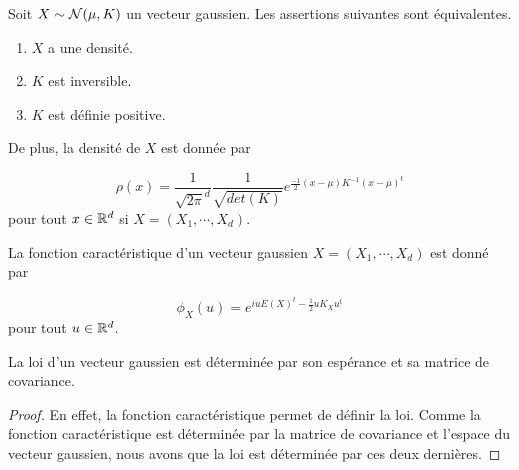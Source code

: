 \begin{proposition}
	Soit $X \sim \mathcal{N}(\mu, K)$ un vecteur gaussien. Les assertions
	suivantes sont équivalentes.

	\begin{enumerate}
		\item $X$ a une densité.
		\item $K$ est inversible.
		\item $K$ est définie positive.
	\end{enumerate}

	De plus, la densité de $X$ est donnée par

	\begin{equation}
		\rho(x) = \frac{1}{\sqrt{2 \pi}^{d}} \frac{1}{\sqrt{det(K)}}
		e^{\frac{-1}{2} (x - \mu) K^{-1} (x - \mu)^{t}}
	\end{equation}
	pour tout $x \in \mathbb{R}^{d}$ si $X = (X_{1}, \cdots, X_{d})$.
\end{proposition}

\begin{proposition}
	La fonction caractéristique d'un vecteur gaussien $X = (X_{1}, \cdots,
	X_{d})$ est donné par

	\begin{equation}
		\phi_{X}(u) = e^{iu E(X)^{t} - \frac{1}{2} u K_{X} u^{t}}
	\end{equation}
	pour tout $u \in \mathbb{R}^{d}$.
\end{proposition}

\begin{corollary}
	La loi d'un vecteur gaussien est déterminée par son espérance et sa matrice
	de covariance.
\end{corollary}

\ifdefined\outputproof
\begin{proof}
	En effet, la fonction caractéristique permet de définir la loi. Comme la
	fonction caractéristique est déterminée par la matrice de covariance et
	l'espace du vecteur gaussien, nous avons que la loi est déterminée par ces
	deux dernières.
\end{proof}
\fi

